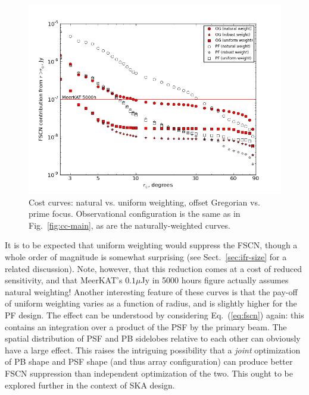 \documentclass{aa}
\begin{document}
\begin{figure}
  \includegraphics[width=\columnwidth]{cc-mk-nat-vs-uni}
\caption{\label{fig:cc-weights}Cost curves: natural vs. uniform weighting, offset Gregorian vs. prime focus. Observational configuration is the same as in Fig.~\ref{fig:cc-main}, as are the naturally-weighted curves.}
\end{figure}

It is to be expected that uniform weighting would suppress the FSCN, though a whole order of magnitude is somewhat surprising (see Sect.~\ref{sec:ifr-size} for a related discussion). Note, however, that this reduction comes at a cost of reduced sensitivity, and that MeerKAT's $0.1\mu$Jy in 5000 hours figure actually assumes natural weighting! Another interesting feature of these curves is that the pay-off of uniform weighting varies as a function of radius, and is slightly higher for the PF design. The effect can be understood by considering  Eq.~(\ref{eq:fscn}) again: this contains an integration over a product of the PSF by the primary beam. The spatial distribution of PSF and PB sidelobes relative to each other can obviously have a large effect. This raises the intriguing possibility that a \emph{joint} optimization of PB shape and PSF shape (and thus array configuration) can produce better FSCN suppression than independent optimization of the two. This ought to be explored further in the context of SKA 
design.
\end{document}
